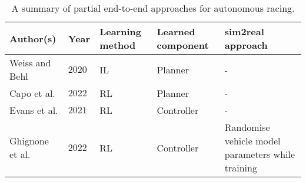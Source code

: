 
\begin{table}[htb!]
\centering
\small
\renewcommand{\arraystretch}{1.1}
\begin{tabularx}{0.9\textwidth}{RYMNL}
    \hline
    \small \textbf{Author(s)} &  \small \textbf{Year} & \small \textbf{Learning method} & \small \textbf{Learned component} & \small \textbf{sim2real approach} \\
    \hline
    \small Weiss and Behl \cite{Weiss2020, Weiss2020a, Weiss2022} & \small $2020$ & \small IL & \small Planner  & - \\
    \small Capo et al. \cite{Capo2020} & \small $2022$ & \small RL &  \small Planner & - \\
    \small Evans et al. \cite{Evans2021b} & \small $2021$ & \small RL &  \small Controller & - \\
    \small Ghignone et al. \cite{Ghignone2022} & \small $2022$ & \small RL &  \small Controller  & \small Randomise vehicle model parameters while training \\
    \hline
\end{tabularx}
\caption[A summary of partial end-to-end approaches for autonomous racing]{A summary of partial end-to-end approaches for autonomous racing.}
\label{table:autonomous_racing_partial_end_to_end_summary}
\end{table} 
